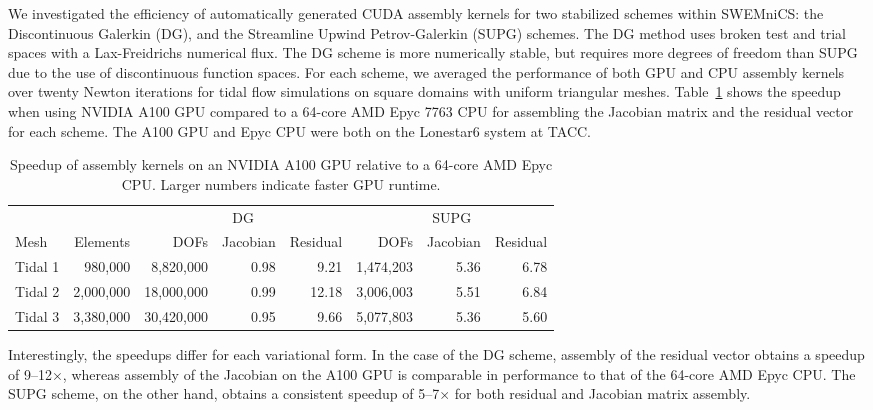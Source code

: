 We investigated the efficiency of automatically generated CUDA assembly kernels for two stabilized schemes within SWEMniCS: the Discontinuous Galerkin (DG), and the Streamline Upwind Petrov-Galerkin (SUPG) schemes. The DG method uses broken test and trial spaces with a Lax-Freidrichs numerical flux. The DG scheme is more numerically stable, but requires more degrees of freedom than SUPG due to the use of discontinuous function spaces. For each scheme, we averaged the performance of both GPU and CPU assembly kernels over twenty Newton iterations for tidal flow simulations on square domains with uniform triangular meshes. Table~\ref{tab:swe_a100_vs_epyc} shows the speedup when using NVIDIA A100 GPU compared to a 64-core AMD Epyc 7763 CPU for assembling the Jacobian matrix and the residual vector for each scheme. The A100 GPU and Epyc CPU were both on the Lonestar6 system at TACC.
\begin{table}[t]
    \centering
    \begin{tabular}{lrrrrrrr}
\toprule
        &           &           \multicolumn{3}{c}{DG} & \multicolumn{3}{c}{SUPG} \\
                                  \cmidrule(lr){3-5}       \cmidrule(lr){6-8}
Mesh    &  Elements &  DOFs & Jacobian & Residual  & DOFs  & Jacobian & Residual \\
\midrule
Tidal 1 &   980,000 &  8,820,000 &     0.98 &      9.21 &  1,474,203 &   5.36 &     6.78 \\
Tidal 2 & 2,000,000 & 18,000,000 &     0.99 &     12.18 &  3,006,003 &   5.51 &     6.84 \\
Tidal 3 & 3,380,000 & 30,420,000 &     0.95 &      9.66 &  5,077,803 &   5.36 &     5.60 \\
\bottomrule
\end{tabular}
    \caption{Speedup of assembly kernels on an NVIDIA A100 GPU relative to a 64-core AMD Epyc CPU. Larger numbers indicate faster GPU runtime.}
    \label{tab:swe_a100_vs_epyc}
\end{table}


Interestingly, the speedups differ for each variational form. In the case of the DG scheme, assembly of the residual vector obtains a speedup of 9--12${\times}$, whereas assembly of the Jacobian on the A100 GPU is comparable in performance to that of the 64-core AMD Epyc CPU. The SUPG scheme, on the other hand, obtains a consistent speedup of 5--7${\times}$ for both residual and Jacobian matrix assembly.

